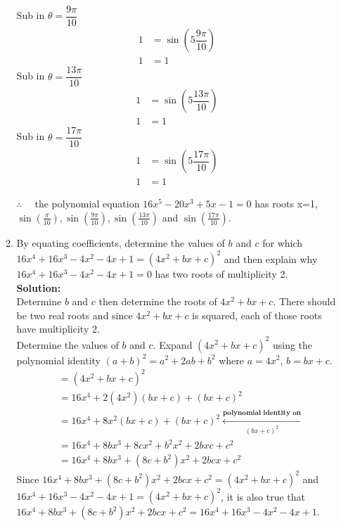 \documentclass[12pt]{book}
\begin{document}
\begin{enumerate}
\begin{enumerate}
Sub in $\theta = \dfrac{9\pi}{10}$
\begin{align}
    1 &= \sin\left(5\dfrac{9\pi}{10}\right) \\
    1 &= 1
\end{align}
Sub in $\theta = \dfrac{13\pi}{10}$
\begin{align}
    1 &= \sin\left(5\dfrac{13\pi}{10}\right) \\
    1 &= 1
\end{align}
Sub in $\theta = \dfrac{17\pi}{10}$
\begin{align}
    1 &= \sin\left(5\dfrac{17\pi}{10}\right) \\
    1 &= 1
\end{align}

$\therefore \quad$ the polynomial equation $16x^5 - 20x^3 + 5x - 1 = 0$ has roots x=1, $\sin(\frac{\pi}{10}), \sin(\frac{9\pi}{10}), \sin(\frac{13\pi}{10})$  and $\sin(\frac{17\pi}{10})$.



\item By equating coefficients, determine the values of $b$ and $c$ for which $16x^4 + 16x^3 -4x^2 - 4x + 1 = (4x^2 + bx + c)^2$ and then explain why $16x^4 + 16x^3 -4x^2 - 4x + 1 = 0$ has two roots of multiplicity 2. \\

\textbf{Solution:}\\
Determine $b$ and $c$ then determine the roots of $4x^2 + bx + c$. There should be two real roots and since $4x^2 + bx + c$ is squared, each of those roots have multiplicity 2. \\

Determine the values of $b$ and $c$. Expand $(4x^2 + bx + c)^2$ using the polynomial identity $(a+b)^2 = a^2+2ab+b^2$ where $a=4x^2$, $b= bx+c$.
\setcounter{equation}{0}
\begin{align}
    &= (4x^2 + bx + c)^2 \\
    &= 16x^4 +2(4x^2)(bx+c)+(bx+c)^2 \\
    &= 16x^4 +8x^2(bx+c)+(bx+c)^2 \xleftarrow[(bx+c)^2]{\textbf{polynomial identity on}} \\
    &= 16x^4 +8bx^3+8cx^2+b^2x^2+2bxc+c^2 \\
    &= 16x^4 +8bx^3+ (8c+b^2)x^2+2bcx+c^2
\end{align}
Since $16x^4 +8bx^3+ (8c+b^2)x^2+2bcx+c^2 = (4x^2 + bx + c)^2$ and $16x^4 + 16x^3 -4x^2 - 4x + 1 = (4x^2 + bx + c)^2$, it is also true that $16x^4 +8bx^3+ (8c+b^2)x^2+2bcx+c^2 = 16x^4 + 16x^3 -4x^2 - 4x + 1$.\\


\end{enumerate}
\end{enumerate}
\end{document}

